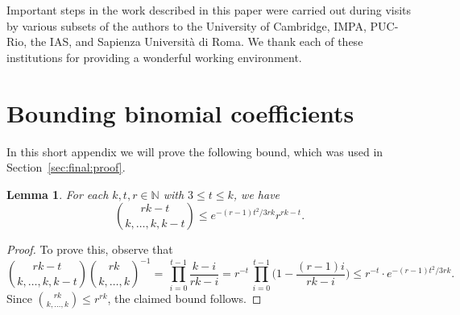 \documentclass[12pt,reqno]{amsart}
\newtheorem{lemma}[theorem]{Lemma}
\theoremstyle{definition}
\theoremstyle{remark}
\newcommand\N{\mathbb{N}}
\renewcommand{\le}{\leqslant}
\def\N{\mathbb{N}}
\begin{document}
Important steps in the work described in this paper were carried out during visits by various subsets of the authors to the University of Cambridge, IMPA, PUC-Rio, the IAS, %
and Sapienza Università di Roma. We thank each of these institutions for providing a wonderful working environment.

\appendix

\section{Bounding binomial coefficients}\label{app:binomial}

In this short appendix we will prove the following bound, which was used in Section~\ref{sec:final:proof}. 

\begin{lemma}\label{lem:multibounds}
For each $k,t,r \in \N$ with $3 \le t \le k$, we have
$$\binom{rk-t}{k,\dots,k,k-t} \le e^{-(r-1)t^2/3rk} r^{rk-t}.$$
\end{lemma}
 
\begin{proof}
To prove this, observe that 
$$\binom{rk-t}{k,\dots,k,k-t} \binom{rk}{k,\dots,k}^{-1} = \, \prod_{i = 0}^{t - 1} \frac{k - i}{rk - i} = r^{-t} \,\prod_{i = 0}^{t-1} \bigg( 1 - \frac{(r-1)i}{rk - i} \bigg) \le r^{-t} \cdot e^{-(r-1)t^2/3rk}.$$
Since $\binom{rk}{k,\dots,k} \le r^{rk}$, the claimed bound follows.
\end{proof}
\end{document}
